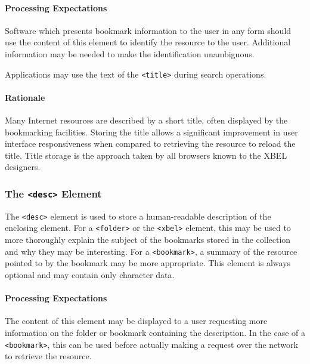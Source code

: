 \documentclass{howto}
\newcommand{\element}[1]{\texttt{<#1>}}
\begin{document}
      \paragraph*{Processing Expectations}
        Software which presents bookmark information to the user in
        any form should use the content of this element to identify
        the resource to the user.  Additional information may be
        needed to make the identification unambiguous.

        Applications may use the text of the \element{title}
        during search operations.

      \paragraph*{Rationale}
        Many Internet resources are described by a short title, often
        displayed by the bookmarking facilities.  Storing the title
        allows a significant improvement in user interface
        responsiveness when compared to retrieving the resource to
        reload the title.  Title storage is the approach taken by all
        browsers known to the XBEL designers.

    \subsubsection{The \element{desc} Element
                   \label{element-desc}}

      The \element{desc} element is used to store a human-readable
      description of the enclosing element.  For a \element{folder} or 
      the \element{xbel} element,
      this may be used to more thoroughly explain the subject of the
      bookmarks stored in the collection and why they may be
      interesting.  For a \element{bookmark}, a summary of the
      resource pointed to by the bookmark may be more appropriate.
      This element is always optional and may contain only character
      data.

      \paragraph*{Processing Expectations}
        The content of this element may be displayed to a user
        requesting more information on the folder or bookmark
        containing the description.  In the case of a
        \element{bookmark}, this can be used before actually making a
        request over the network to retrieve the resource.
\end{document}
